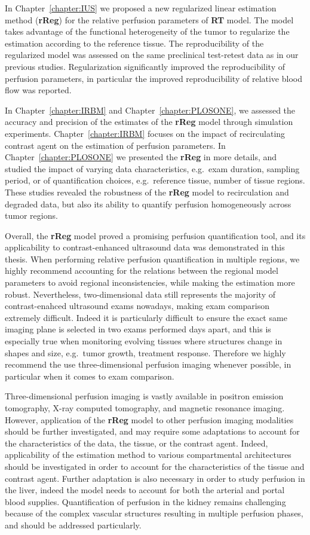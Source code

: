 In Chapter~\ref{chapter:IUS} we proposed a new regularized linear estimation method (\textbf{rReg}) for the relative perfusion parameters of \textbf{RT} model.
The model takes advantage of the functional heterogeneity of the tumor to regularize the estimation according to the reference tissue.
The reproducibility of the regularized model was assessed on the same preclinical test-retest data as in our previous studies.
Regularization significantly improved the reproducibility of perfusion parameters, in particular the improved reproducibility of relative blood flow was reported.

In Chapter~\ref{chapter:IRBM} and Chapter~\ref{chapter:PLOSONE}, we assessed the accuracy and precision of the estimates of the \textbf{rReg} model through simulation experiments.
Chapter~\ref{chapter:IRBM} focuses on the impact of recirculating contrast agent on the estimation of perfusion parameters.
In Chapter~\ref{chapter:PLOSONE} we presented the \textbf{rReg} in more details, and studied the impact of varying data characteristics, e.g.~exam duration, sampling period, or of quantification choices, e.g.~reference tissue, number of tissue regions.
These studies revealed the robustness of the \textbf{rReg} model to recirculation and degraded data, but also its ability to quantify perfusion homogeneously across tumor regions.

Overall, the \textbf{rReg} model proved a promising perfusion quantification tool, and its applicability to contrast-enhanced ultrasound data was demonstrated in this thesis.
When performing relative perfusion quantification in multiple regions, we highly recommend accounting for the relations between the regional model parameters to avoid regional inconsistencies, while making the estimation more robust.
Nevertheless, two-dimensional data still represents the majority of contrast-enahced ultrasound exams nowadays, making exam comparison extremely difficult.
Indeed it is particularly difficult to ensure the exact same imaging plane is selected in two exams performed days apart, and this is especially true when monitoring evolving tissues where structures change in shapes and size, e.g.~tumor growth, treatment response.
Therefore we highly recommend the use three-dimensional perfusion imaging whenever possible, in particular when it comes to exam comparison.

Three-dimensional perfusion imaging is vastly available in positron emission tomography, X-ray computed tomography, and magnetic resonance imaging.
However, application of the \textbf{rReg} model to other perfusion imaging modalities should be further investigated, and may require some adaptations to account for the characteristics of the data, the tissue, or the contrast agent.
Indeed, applicability of the estimation method to various compartmental architectures should be investigated in order to account for the characteristics of the tissue and contrast agent.
Further adaptation is also necessary in order to study perfusion in the liver, indeed the model needs to account for both the arterial and portal blood supplies.
Quantification of perfusion in the kidney remains challenging because of the complex vascular structures resulting in multiple perfusion phases, and should be addressed particularly.

